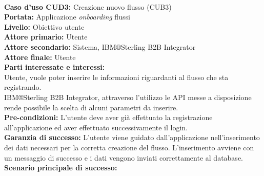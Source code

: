 \ \\
\textbf{Caso d’uso CUD3:} Creazione nuovo flusso (CUB3) \\
\textbf{Portata:} Applicazione \textit{onboarding} flussi\\
\textbf{Livello:} Obiettivo utente \\
\textbf{Attore primario:} Utente \\
\textbf{Attore secondario:} Sistema, IBM®Sterling B2B Integrator \\
\textbf{Attore finale:} Utente \\
\textbf{Parti interessate e interessi:} \\
Utente, vuole poter inserire le informazioni riguardanti al flusso che sta registrando.\\
IBM®Sterling B2B Integrator, attraverso l'utilizzo le API messe a disposizione rende possibile la scelta di alcuni parametri da inserire.\\
\textbf{Pre-condizioni:} L’utente deve aver già effettuato la registrazione all’applicazione ed aver effettuato successivamente il login.\\
\textbf{Garanzia di successo:} L'utente viene guidato dall'applicazione nell'inserimento dei dati necessari per la corretta creazione del flusso. L'inserimento avviene con un messaggio di successo e i dati vengono inviati correttamente al database.
\clearpage
\textbf{Scenario principale di successo:} 
